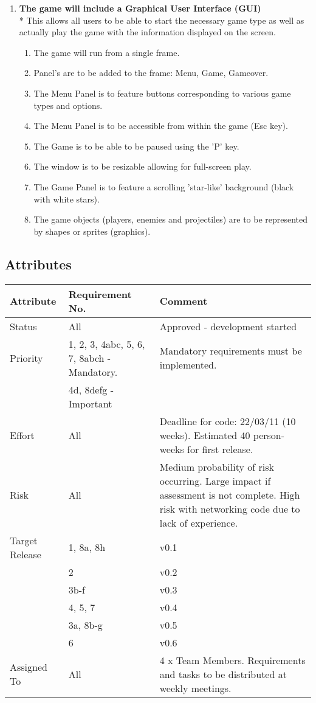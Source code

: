 \begin{enumerate}
\item \textbf{The game will include a Graphical User Interface (GUI)}
\\* This allows all users to be able to start the necessary game type as well as actually play the game with the information displayed on the screen.
\begin{enumerate}
\item The game will run from a single frame.
\item Panel's are to be added to the frame: Menu, Game, Gameover.
\item The Menu Panel is to feature buttons corresponding to various game types and options.
\item The Menu Panel is to be accessible from within the game (Esc key).
\item The Game is to be able to be paused using the 'P' key.
\item The window is to be resizable allowing for full-screen play.
\item The Game Panel is to feature a scrolling 'star-like' background (black with white stars).
\item The game objects (players, enemies and projectiles) are to be represented by shapes or sprites (graphics).
\end{enumerate}

\end{enumerate}


\subsection{Attributes}
\label{sec: req_attributes}

\noindent\begin{tabular}{| l || p{6cm} | p{7cm} |}\hline
  \textbf{Attribute} & \textbf{Requirement No.} & \textbf{Comment}  \\\hline\hline
  Status & All & Approved - development started \\\hline
 Priority & 1, 2, 3, 4abc, 5, 6, 7, 8abch  - Mandatory. &  Mandatory requirements must be implemented.\\
 & 4d, 8defg - Important & \\\hline
 Effort & All & Deadline for code: 22/03/11 (10 weeks). Estimated 40 person-weeks for first release. \\\hline
 Risk & All & Medium probability of risk occurring. Large impact if assessment is not complete. High risk with networking code due to lack of experience. \\\hline
 Target Release & 1, 8a, 8h & v0.1 \\
 & 2 & v0.2 \\
 & 3b-f & v0.3 \\
 & 4, 5, 7 & v0.4 \\
 & 3a, 8b-g & v0.5 \\
 & 6 & v0.6 \\\hline
 Assigned To & All & 4 x Team Members. Requirements and tasks to be distributed at weekly meetings. \\\hline
\end{tabular}\vspace*{1cm}


